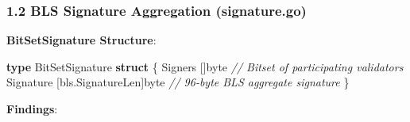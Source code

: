 \documentclass[
]{article}
\newenvironment{Shaded}{}{}
\newcommand{\CommentTok}[1]{\textcolor[rgb]{0.38,0.63,0.69}{\textit{#1}}}
\newcommand{\DataTypeTok}[1]{\textcolor[rgb]{0.56,0.13,0.00}{#1}}
\newcommand{\KeywordTok}[1]{\textcolor[rgb]{0.00,0.44,0.13}{\textbf{#1}}}
\newcommand{\NormalTok}[1]{#1}
\newcommand{\OperatorTok}[1]{\textcolor[rgb]{0.40,0.40,0.40}{#1}}
\begin{document}
\subsubsection{1.2 BLS Signature Aggregation
(signature.go)}\label{12-bls-signature-aggregation-signaturego}

\textbf{BitSetSignature Structure}:

\begin{Shaded}
\begin{Highlighting}[]
\KeywordTok{type}\NormalTok{ BitSetSignature }\KeywordTok{struct} \OperatorTok{\{}
\NormalTok{    Signers   }\OperatorTok{[]}\DataTypeTok{byte}                 \CommentTok{// Bitset of participating validators}
\NormalTok{    Signature }\OperatorTok{[}\NormalTok{bls}\OperatorTok{.}\NormalTok{SignatureLen}\OperatorTok{]}\DataTypeTok{byte} \CommentTok{// 96{-}byte BLS aggregate signature}
\OperatorTok{\}}
\end{Highlighting}
\end{Shaded}

\textbf{Findings}:
\end{document}
